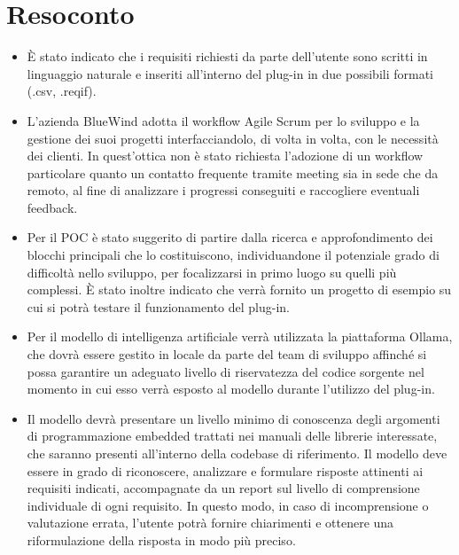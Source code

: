 \documentclass{TWReport}
\begin{document}
	\section*{Resoconto}
	\begin{itemize}
		\item È stato indicato che i requisiti richiesti da parte dell'utente sono scritti in linguaggio naturale e inseriti all'interno del plug-in in due possibili formati (.csv, .reqif).
		\item L'azienda BlueWind adotta il workflow Agile Scrum per lo sviluppo e la gestione dei suoi progetti interfacciandolo, di volta in volta, con le necessità dei clienti. In quest'ottica non è stato richiesta l'adozione di un workflow particolare quanto un contatto frequente tramite meeting sia in sede che da remoto, al fine di analizzare i progressi conseguiti e raccogliere eventuali feedback.
		\item Per il POC è stato suggerito di partire dalla ricerca e approfondimento dei blocchi principali che lo costituiscono, individuandone il potenziale grado di difficoltà nello sviluppo, per focalizzarsi in primo luogo su quelli più complessi. È stato inoltre indicato che verrà fornito un progetto di esempio su cui si potrà testare il funzionamento del plug-in.
		\item Per il modello di intelligenza artificiale verrà utilizzata la piattaforma Ollama, che dovrà essere gestito in locale da parte del team di sviluppo affinché si possa garantire un adeguato livello di riservatezza del codice sorgente nel momento in cui esso verrà esposto al modello durante l'utilizzo del plug-in.
		\item Il modello devrà presentare un livello minimo di conoscenza degli argomenti di programmazione embedded trattati nei manuali delle librerie interessate, che saranno presenti all'interno della codebase di riferimento. Il modello deve essere in grado di riconoscere, analizzare e formulare risposte attinenti ai requisiti indicati, accompagnate da un report sul livello di comprensione individuale di ogni requisito. In questo modo, in caso di incomprensione o valutazione errata, l'utente potrà fornire chiarimenti e ottenere una riformulazione della risposta in modo più preciso.
		
	\end{itemize}
	
	\signature{L'Azienda Proponente}
\end{document}
